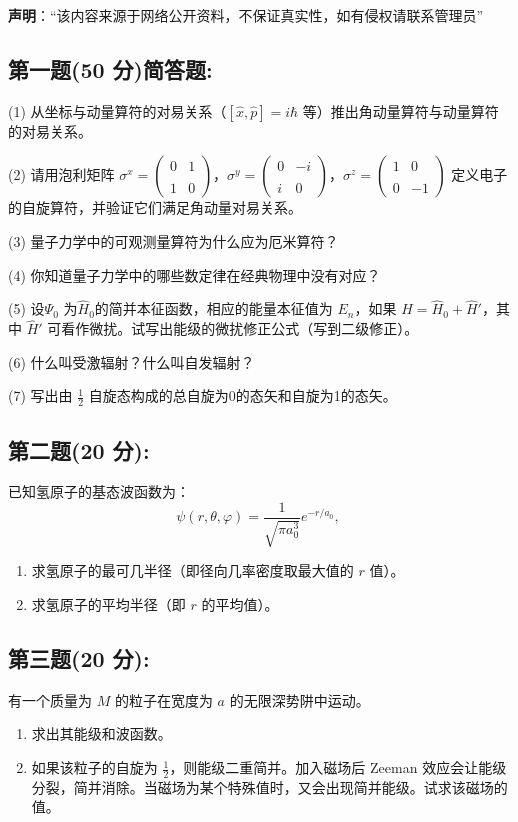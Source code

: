 
\textbf{声明}：“该内容来源于网络公开资料，不保证真实性，如有侵权请联系管理员”

\subsection{第一题(50 分)简答题:}
(1) 从坐标与动量算符的对易关系（$[\hat{x}, \hat{p}] = i\hbar$ 等）推出角动量算符与动量算符的对易关系。

(2) 请用泡利矩阵 $\sigma^x = \begin{pmatrix} 0 & 1 \\\\ 1 & 0 \end{pmatrix}$，$\sigma^y = \begin{pmatrix} 0 & -i \\\\ i & 0 \end{pmatrix}$，$\sigma^z = \begin{pmatrix} 1 & 0 \\\\ 0 & -1 \end{pmatrix}$ 定义电子的自旋算符，并验证它们满足角动量对易关系。

(3) 量子力学中的可观测量算符为什么应为厄米算符？

(4) 你知道量子力学中的哪些数定律在经典物理中没有对应？

(5) 设$\Psi_0$ 为$\hat{H}_0$的简并本征函数，相应的能量本征值为 $E_n$，如果 $\hat{H} = \hat{H}_0 + \hat{H}'$，其中 $\hat{H}'$ 可看作微扰。试写出能级的微扰修正公式（写到二级修正）。

(6) 什么叫受激辐射？什么叫自发辐射？

(7) 写出由 $\frac{1}{2}$ 自旋态构成的总自旋为0的态矢和自旋为1的态矢。
\subsection{第二题(20 分):}
已知氢原子的基态波函数为：
\[\psi(r, \theta, \varphi) = \frac{1}{\sqrt{\pi a_0^3}} e^{-r / a_0},~\]
\begin{enumerate}
    \item 求氢原子的最可几半径（即径向几率密度取最大值的 $r$ 值）。
    \item 求氢原子的平均半径（即 $r$ 的平均值）。
\end{enumerate}
\subsection{第三题(20 分):}
有一个质量为 $M$ 的粒子在宽度为 $a$ 的无限深势阱中运动。
\begin{enumerate}
    \item 求出其能级和波函数。
    \item 如果该粒子的自旋为 $\frac{1}{2}$，则能级二重简并。加入磁场后 Zeeman 效应会让能级分裂，简并消除。当磁场为某个特殊值时，又会出现简并能级。试求该磁场的值。
\end{enumerate}